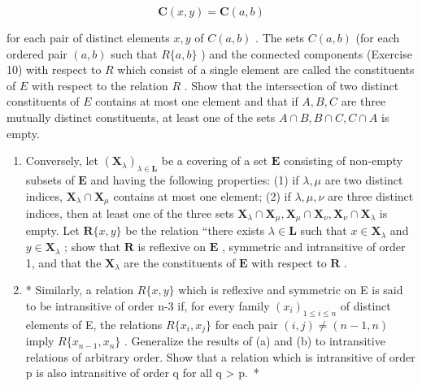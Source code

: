 \[
\mathbf {C} (x, y) = \mathbf {C} (a, b)
\]

for each pair of distinct elements \(x, y\) of \(C(a, b)\) . The sets \(C(a, b)\) (for each ordered pair \((a, b)\) such that \(R\{a, b\}\) ) and the connected components (Exercise 10) with respect to \(R\) which consist of a single element are called the constituents of \(E\) with respect to the relation \(R\) . Show that the intersection of two distinct constituents of \(E\) contains at most one element and that if \(A, B, C\) are three mutually distinct constituents, at least one of the sets \(A \cap B, B \cap C, C \cap A\) is empty.

\begin{enumerate}
\def\labelenumi{(\alph{enumi})}
\setcounter{enumi}{1}
\item
  Conversely, let \((\mathbf{X}_{\lambda})_{\lambda \in \mathbf{L}}\) be a covering of a set \(\mathbf{E}\) consisting of non-empty subsets of \(\mathbf{E}\) and having the following properties: (1) if \(\lambda, \mu\) are two distinct indices, \(\mathbf{X}_{\lambda} \cap \mathbf{X}_{\mu}\) contains at most one element; (2) if \(\lambda, \mu, \nu\) are three distinct indices, then at least one of the three sets \(\mathbf{X}_{\lambda} \cap \mathbf{X}_{\mu}, \mathbf{X}_{\mu} \cap \mathbf{X}_{\nu}, \mathbf{X}_{\nu} \cap \mathbf{X}_{\lambda}\) is empty. Let \(\mathbf{R}\{x, y\}\) be the relation ``there exists \(\lambda \in \mathbf{L}\) such that \(x \in \mathbf{X}_{\lambda}\) and \(y \in \mathbf{X}_{\lambda}\) ; show that \(\mathbf{R}\) is reflexive on \(\mathbf{E}\) , symmetric and intransitive of order 1, and that the \(\mathbf{X}_{\lambda}\) are the constituents of \(\mathbf{E}\) with respect to \(\mathbf{R}\) .
\item
  * Similarly, a relation \(R\{x, y\}\) which is reflexive and symmetric on E is said to be intransitive of order n-3 if, for every family \((x_{i})_{1 \leqslant i \leqslant n}\) of distinct elements of E, the relations \(R\{x_{i}, x_{j}\}\) for each pair \((i, j) \neq (n-1, n)\) imply \(R\{x_{n-1}, x_{n}\}\) . Generalize the results of (a) and (b) to intransitive relations of arbitrary order. Show that a relation which is intransitive of order p is also intransitive of order q for all q \textgreater{} p.~*
\end{enumerate}
